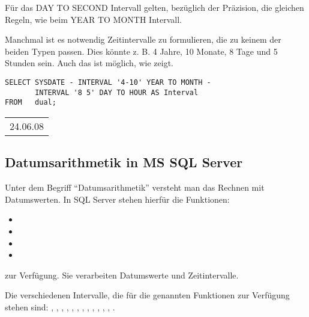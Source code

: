 \begin{merke}
    Für das DAY TO SECOND Intervall gelten, bezüglich der
    Präzision, die gleichen Regeln, wie beim YEAR TO MONTH Intervall.
\end{merke}
Manchmal ist es notwendig Zeitintervalle zu formulieren, die zu keinem
der beiden Typen passen. Dies könnte z. B. 4 Jahre, 10 Monate, 8
Tage und 5 Stunden sein. Auch das ist möglich, wie
 zeigt.
\begin{lstlisting}[language=oracle_sql,caption={Ein komplexe Zeitintervall},label=sql03_21]
SELECT SYSDATE - INTERVAL '4-10' YEAR TO MONTH -
       INTERVAL '8 5' DAY TO HOUR AS Interval
FROM   dual;
          \end{lstlisting}
\begin{center}
    \begin{small}
        \tablehead{}
        \begin{oraclesql}
            \begin{supertabular}{l}
                24.06.08 \\
            \end{supertabular}
        \end{oraclesql}
    \end{small}
\end{center}
\subsection{Datumsarithmetik in MS SQL Server}
Unter dem Begriff \enquote{Datumsarithmetik} versteht man das Rechnen mit Datumswerten. In SQL Server stehen hierfür die Funktionen:
\begin{itemize}
    \item {}
    \item {}
    \item {}
    \item {}
\end{itemize}
zur Verfügung. Sie verarbeiten Datumswerte und Zeitintervalle.
\begin{merke}
    Die verschiedenen Intervalle, die für die genannten Funktionen zur
    Verfügung stehen sind: ,
    ,  ,
    , , ,
    , , ,
    , , ,
    .
\end{merke}
